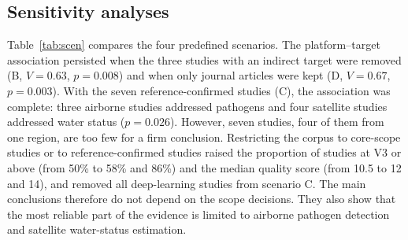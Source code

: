 \documentclass[preprint,12pt]{elsarticle}
\begin{document}
\subsection{Sensitivity analyses}\label{sec:sensitivity}
Table~\ref{tab:scen} compares the four predefined scenarios. The platform--target association persisted when the three studies with an indirect target were removed (B, $V=0.63$, $p=0.008$) and when only journal articles were kept (D, $V=0.67$, $p=0.003$). With the seven reference-confirmed studies (C), the association was complete: three airborne studies addressed pathogens and four satellite studies addressed water status ($p=0.026$). However, seven studies, four of them from one region, are too few for a firm conclusion. Restricting the corpus to core-scope studies or to reference-confirmed studies raised the proportion of studies at V3 or above (from 50\% to 58\% and 86\%) and the median quality score (from 10.5 to 12 and 14), and removed all deep-learning studies from scenario C. The main conclusions therefore do not depend on the scope decisions. They also show that the most reliable part of the evidence is limited to airborne pathogen detection and satellite water-status estimation.
 
\begin{table}[H]\centering\footnotesize\setlength\tabcolsep{4pt}
\caption{Sensitivity analysis. A, all included studies; B, core scope (excluding indirect targets: land-cover change and systems without a disease evaluation); C, reference-confirmed outcome (qPCR/PCR or physiological measurement); D, journal articles only. $V$ (bias-corrected) and Monte-Carlo $p$ refer to platform $\times$ target.}\label{tab:scen}
\end{table}
 
\end{document}
